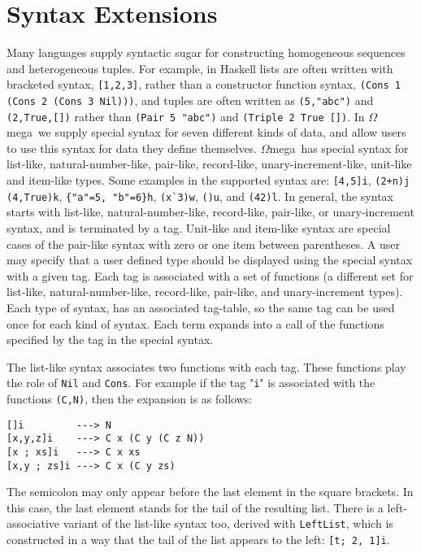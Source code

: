 \documentclass[11pt,twoside]{article}
\newcommand{\om}{$\Omega$mega}
\begin{document}
\section{Syntax Extensions} \label{synext}

Many languages supply syntactic sugar for constructing homogeneous sequences and
heterogeneous tuples. For example, in Haskell lists are often
written with bracketed syntax, \verb+[1,2,3]+, rather than a constructor function syntax, \verb+(Cons 1 (Cons 2 (Cons 3 Nil)))+, and
tuples are often written as \verb+(5,"abc")+ and \verb+(2,True,[])+
rather than \verb+(Pair 5 "abc")+ and \verb+(Triple 2 True [])+. In \om\
we supply special syntax for seven different kinds of data, and allow users to
use this syntax for data they define themselves. \om\ has
special syntax for list-like, natural-number-like, pair-like, record-like,
unary-increment-like, unit-like and item-like types.
Some examples in the supported syntax are: \verb+[4,5]i+, \verb|(2+n)j|
\verb+(4,True)k+, \verb+{"a"=5, "b"=6}h+, \verb+(x`3)w+, \verb+()u+, and \verb+(42)l+.
In general, the syntax starts with list-like, natural-number-like, record-like, pair-like,
or unary-increment syntax, and is terminated by a tag. Unit-like and item-like syntax are
special cases of the pair-like syntax with zero or one item between parentheses. A user
may specify that a user defined type should be displayed using the special syntax with
a given tag. Each tag is associated with a set of functions (a different set for
list-like, natural-number-like, record-like, pair-like, and unary-increment types).
Each type of syntax, has an associated tag-table, so the same tag can be used once for
each kind of syntax. Each term expands into a call of the functions specified by the
tag in the special syntax.

The list-like syntax associates two functions with each
tag. These functions play the role of {\tt Nil} and {\tt Cons}.
For example if the tag "{\tt i}" is associated with
the functions {\tt (C,N)}, then the expansion is as follows:
\begin{verbatim}
[]i         ---> N
[x,y,z]i    ---> C x (C y (C z N))
[x ; xs]i   ---> C x xs
[x,y ; zs]i ---> C x (C y zs)
\end{verbatim}
\noindent
The semicolon may only appear before the last element in the square brackets.
In this case, the last element stands for the tail of the resulting list. There
is a left-associative variant of the list-like syntax too, derived with \verb+LeftList+,
which is constructed in a way that the tail of the list appears to the left: \verb+[t; 2, 1]i+.
\end{document}
